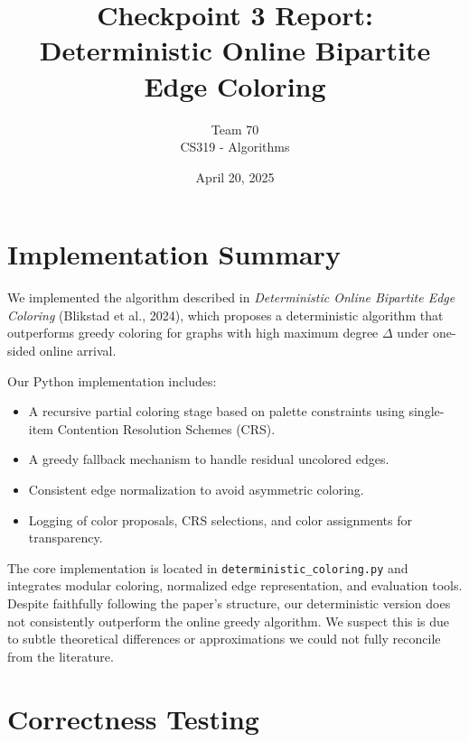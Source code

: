 \documentclass[11pt]{article}
\title{\textbf{Checkpoint 3 Report: \\Deterministic Online Bipartite Edge Coloring}}
\author{Team 70 \\ CS319 - Algorithms}
\date{April 20, 2025}
\begin{document}
\maketitle

\section{Implementation Summary}

We implemented the algorithm described in \textit{Deterministic Online Bipartite Edge Coloring} (Blikstad et al., 2024), which proposes a deterministic algorithm that outperforms greedy coloring for graphs with high maximum degree $\Delta$ under one-sided online arrival.

Our Python implementation includes:
\begin{itemize}
  \item A recursive partial coloring stage based on palette constraints using single-item Contention Resolution Schemes (CRS).
  \item A greedy fallback mechanism to handle residual uncolored edges.
  \item Consistent edge normalization to avoid asymmetric coloring.
  \item Logging of color proposals, CRS selections, and color assignments for transparency.
\end{itemize}

The core implementation is located in \texttt{deterministic\_coloring.py} and integrates modular coloring, normalized edge representation, and evaluation tools. Despite faithfully following the paper's structure, our deterministic version does not consistently outperform the online greedy algorithm. We suspect this is due to subtle theoretical differences or approximations we could not fully reconcile from the literature.

\section{Correctness Testing}
\end{document}
